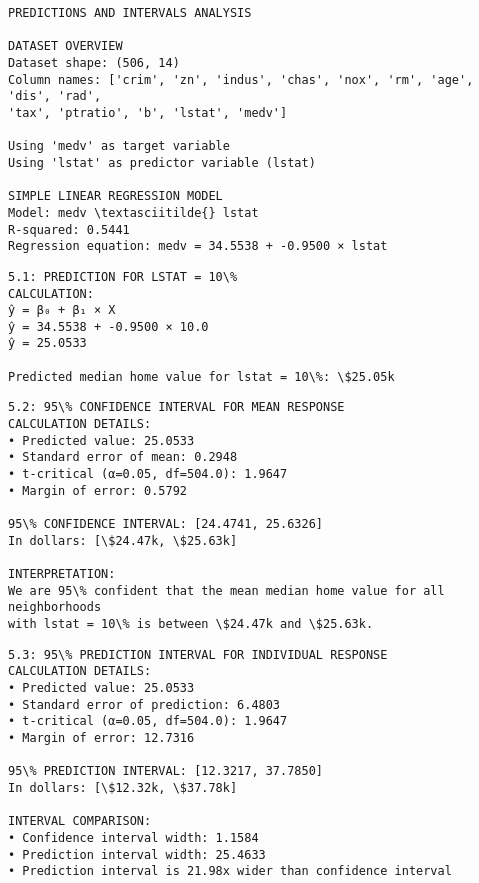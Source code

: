 \documentclass[8pt, twocolumn]{extarticle}
\begin{document}
    \begin{Verbatim}[commandchars=\\\{\}]
PREDICTIONS AND INTERVALS ANALYSIS

DATASET OVERVIEW
Dataset shape: (506, 14)
Column names: ['crim', 'zn', 'indus', 'chas', 'nox', 'rm', 'age', 'dis', 'rad',
'tax', 'ptratio', 'b', 'lstat', 'medv']

Using 'medv' as target variable
Using 'lstat' as predictor variable (lstat)

SIMPLE LINEAR REGRESSION MODEL
Model: medv \textasciitilde{} lstat
R-squared: 0.5441
Regression equation: medv = 34.5538 + -0.9500 × lstat

    \end{Verbatim}

    \begin{Verbatim}[commandchars=\\\{\}]
5.1: PREDICTION FOR LSTAT = 10\%
CALCULATION:
ŷ = β₀ + β₁ × X
ŷ = 34.5538 + -0.9500 × 10.0
ŷ = 25.0533

Predicted median home value for lstat = 10\%: \$25.05k

    \end{Verbatim}

    \begin{Verbatim}[commandchars=\\\{\}]
5.2: 95\% CONFIDENCE INTERVAL FOR MEAN RESPONSE
CALCULATION DETAILS:
• Predicted value: 25.0533
• Standard error of mean: 0.2948
• t-critical (α=0.05, df=504.0): 1.9647
• Margin of error: 0.5792

95\% CONFIDENCE INTERVAL: [24.4741, 25.6326]
In dollars: [\$24.47k, \$25.63k]

INTERPRETATION:
We are 95\% confident that the mean median home value for all neighborhoods
with lstat = 10\% is between \$24.47k and \$25.63k.

    \end{Verbatim}

    \begin{Verbatim}[commandchars=\\\{\}]
5.3: 95\% PREDICTION INTERVAL FOR INDIVIDUAL RESPONSE
CALCULATION DETAILS:
• Predicted value: 25.0533
• Standard error of prediction: 6.4803
• t-critical (α=0.05, df=504.0): 1.9647
• Margin of error: 12.7316

95\% PREDICTION INTERVAL: [12.3217, 37.7850]
In dollars: [\$12.32k, \$37.78k]

INTERVAL COMPARISON:
• Confidence interval width: 1.1584
• Prediction interval width: 25.4633
• Prediction interval is 21.98x wider than confidence interval

    \end{Verbatim}
\end{document}
